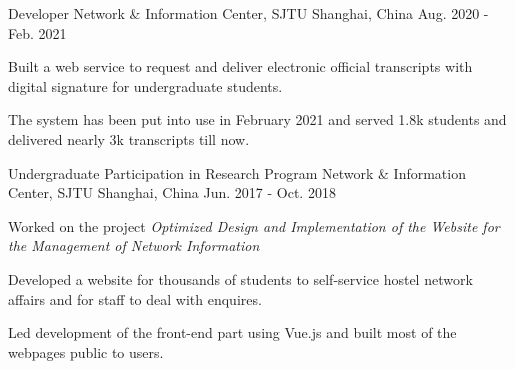 

\begin{cventries}


    \cventry
    {Developer} %
    {Network \& Information Center, SJTU} %
    {Shanghai, China} %
    {Aug. 2020 - Feb. 2021} %
    { %
        \begin{cvitems}
            \item Built a web service to request and deliver electronic official transcripts with digital signature for undergraduate students.
            \item The system has been put into use in February 2021 and served 1.8k students and delivered nearly 3k transcripts till now.
        \end{cvitems}
    }




    \cventry
    {Undergraduate Participation in Research Program} %
    {Network \& Information Center, SJTU} %
    {Shanghai, China} %
    {Jun. 2017 - Oct. 2018} %
    { %
        \begin{cvitems}
            \item Worked on the project \textit{Optimized Design and Implementation of the Website for the Management of Network Information}
            \item Developed a website for thousands of students to self-service hostel network affairs and for staff to deal with enquires.
            \item Led development of the front-end part using Vue.js and built most of the webpages public to users.
        \end{cvitems}
    }


\end{cventries}
